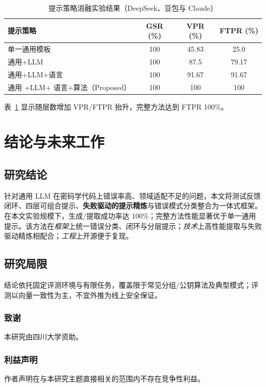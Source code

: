 \documentclass[runningheads]{llncs}
\begin{document}
\begin{table}[H]
  \centering
  \caption{提示策略消融实验结果（DeepSeek、豆包与 Claude）}
  \label{tab:ablation_prompt}
  \setlength{\tabcolsep}{2pt}
  \begin{tabular}{l c c c}
    \toprule
    提示策略               & GSR (\%) & VPR (\%) & FTPR (\%) \\
    \midrule
    单一通用模板         & 100    & 45.83    & 25.0      \\
    通用+LLM              & 100    & 87.5     & 79.17     \\
    通用+LLM+语言        & 100    & 91.67    & 91.67     \\
    通用 +LLM+ 语言+算法（Proposed） & 100 & 100 & 100 \\
    \bottomrule
  \end{tabular}
\end{table}
表~\ref{tab:ablation_prompt} 显示随层数增加 VPR/FTPR 抬升，完整方法达到 FTPR 100\%。

\section{结论与未来工作}
\subsection{研究结论}
针对通用 LLM 在密码学代码上错误率高、领域适配不足的问题，本文将测试反馈闭环、四层可组合提示、\textbf{失败驱动的提示精炼}与错误模式分类整合为一体式框架。在本文实验规模下，生成/提取成功率达 100\%；完整方法性能显著优于单一通用提示。该方法在\emph{框架}上统一错误分类、闭环与分层提示；\emph{技术}上高性能提取与失败驱动精炼相配合；\emph{工程}上开源便于复现。
\subsection{研究局限}
结论依托固定评测环境与有限任务，覆盖限于常见分组/公钥算法及典型模式；评测以向量一致性为主，不宜外推为线上安全保证。
\begin{credits}
{
\subsubsection{致谢}
本研究由四川大学资助。

\subsubsection{利益声明}
作者声明在与本研究主题直接相关的范围内不存在竞争性利益。
}
\end{credits}

\renewcommand{\refname}{参考文献}
\renewcommand{\bibname}{参考文献}

 
\end{document}
